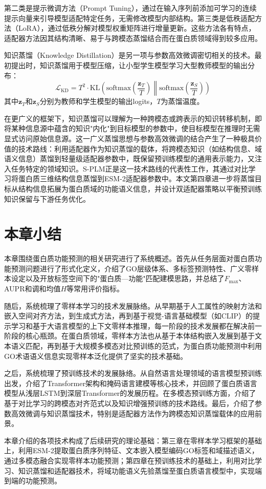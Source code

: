 第二类是提示微调方法（Prompt Tuning），通过在输入序列前添加可学习的连续提示向量来引导模型适配特定任务，无需修改模型内部结构。第三类是低秩适配方法（LoRA）\cite{hu2022lora}，通过低秩分解对模型权重矩阵进行增量更新。这些方法各有特点，适配器方法因其结构清晰、易于与跨模态蒸馏结合而在蛋白质领域得到较多应用。

知识蒸馏（Knowledge Distillation）\cite{hinton2015distilling}是另一项与参数高效微调密切相关的技术。最初提出时，知识蒸馏用于模型压缩，让小型学生模型学习大型教师模型的输出分布：
\begin{equation}
\mathcal{L}_{\text{KD}} = T^2 \cdot \text{KL}\left(\text{softmax}\left(\frac{\mathbf{z}_T}{T}\right) \middle\| \text{softmax}\left(\frac{\mathbf{z}_S}{T}\right)\right)
\end{equation}
其中$\mathbf{z}_T$和$\mathbf{z}_S$分别为教师和学生模型的输出logits，$T$为蒸馏温度。

在更广义的框架下，知识蒸馏可以理解为一种跨模态或跨表示的知识转移机制，即将某种信息源中蕴含的知识"内化"到目标模型的参数中，使目标模型在推理时无需显式访问原始信息源。这一广义蒸馏思想与参数高效微调的结合产生了一种极具价值的技术路线：利用适配器作为知识蒸馏的载体，将跨模态知识（如结构信息、域语义信息）蒸馏到轻量级适配器参数中，既保留预训练模型的通用表示能力，又注入任务特定的领域知识。S-PLM\cite{wang2025splm}正是这一技术路线的代表性工作，其通过对比学习将蛋白质三维结构信息蒸馏到ESM-2适配器参数中。本文第四章进一步将蒸馏目标从结构信息拓展为蛋白质域的功能语义信息，并设计双适配器策略以平衡预训练知识保留与下游任务优化。

\section{本章小结}

本章围绕蛋白质功能预测的相关研究进行了系统概述。首先从任务层面对蛋白质功能预测问题进行了形式化定义，介绍了GO层级体系、多标签预测特性、广义零样本设定以及开放标签空间下的"蛋白质—功能"匹配建模思路，并总结了$F_{\max}$、AUPR和调和均值$H$等常用评价指标。

随后，系统梳理了零样本学习的技术发展脉络。从早期基于人工属性的映射方法和嵌入空间对齐方法，到生成式方法，再到基于视觉-语言基础模型（如CLIP）的提示学习和基于大语言模型的上下文零样本推理，每一阶段的技术发展都在解决前一阶段的核心瓶颈。在蛋白质领域，零样本方法也从基于本体结构嵌入发展到基于文本语义匹配，再到基于大规模多模态对比预训练的范式，为蛋白质功能预测中利用GO术语语义信息实现零样本泛化提供了坚实的技术基础。

之后，系统梳理了预训练技术的发展脉络。从自然语言处理领域的语言模型预训练出发，介绍了Transformer架构和掩码语言建模等核心技术，并回顾了蛋白质语言模型从浅层LSTM到深层Transformer的发展历程。在多模态预训练方面，介绍了基于对比学习的跨模态对齐范式以及知识增强预训练的技术路线。最后，介绍了参数高效微调与知识蒸馏技术，特别是适配器方法作为跨模态知识蒸馏载体的应用前景。

本章介绍的各项技术构成了后续研究的理论基础：第三章在零样本学习框架的基础上，利用ESM-2提取蛋白质序列特征、文本嵌入模型编码GO标签和域描述语义，通过多模态融合实现零样本功能预测；第四章在预训练技术的基础上，利用对比学习、知识蒸馏和适配器技术，将域功能语义先验蒸馏至蛋白质语言模型中，实现端到端的功能预测。
